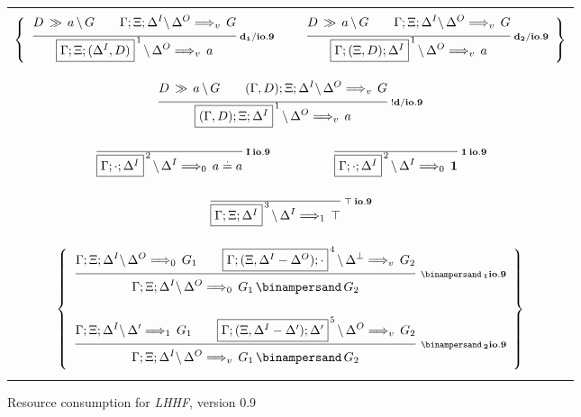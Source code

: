 \clearpage
\begin{figure}[t]
  \begin{center}
    \leavevmode

    \begin{tabular}{|c|}
      \hline \\
      $\left\{
        \begin{array}{ccc}
          \ruleII
            {\decd{D}{a}{G}}
            {\ioIX{\G;\X;\D^I}{\D^O}{G}{v}}
            {\ioIX{\fb{\G;\X;(\D^I,D)}{1}}{\D^O}{a}{v}}
            {d_1/io.9}
        &
          \hspace{0.5em}
        &
          \ruleII
            {\decd{D}{a}{G}}
            {\ioIX{\G;\X;\D^I}{\D^O}{G}{v}}
            {\ioIX{\fb{\G;(\X,D);\D^I}{1}}{\D^O}{a}{v}}
            {d_2/io.9}
        \end{array}
      \right\}$

      \\ \\ \\
      $\ruleII
        {\decd{D}{a}{G}}
        {\ioIX{(\G,D);\X;\D^I}{\D^O}{G}{v}}
        {\ioIX{\fb{(\G,D);\X;\D^I}{1}}{\D^O}{a}{v}}
        {!d/io.9}$

      \\ \\
      $\begin{array}{ccc}
        \ruleI
          {}
          {\ioIX{\fb{\G;\cdot;\D^I}{2}}{\D^I}{\eq{a}{a}}{0}}
          {I \: io.9}
      &
        \hspace{3em}
      &
        \ruleI
          {}
          {\ioIX{\fb{\G;\cdot;\D^I}{2}}{\D^I}{\One}{0}}
          {\One \: io.9}
      \end{array}$

      \\ \\
      $\ruleI
        {}
        {\ioIX{\fb{\G;\X;\D^I}{3}}{\D^I}{\Top}{1}}
        {\Top \: io.9}$

      \\ \\ \\
      $\left\{
        \begin{array}{c}
          \ruleII
            {\ioIX{\G;\X;\D^I}{\D^O}{G_1}{0}}
            {\ioIX{\fb{\G;(\X,\D^I-\D^O);\cdot}{4}}{\D^\Bot}{G_2}{v}}
            {\ioIX{\G;\X;\D^I}{\D^O}{G_1 \With G_2}{0}}
            {\With_1 io.9}
        \\ \\
          \ruleII
            {\ioIX{\G;\X;\D^I}{\D'}{G_1}{1}}
            {\ioIX{\fb{\G;(\X,\D^I-\D');\D'}{5}}{\D^O}{G_2}{v}}
            {\ioIX{\G;\X;\D^I}{\D^O}{G_1 \With G_2}{v}}
            {\With_2 io.9}
        \end{array}
      \right\}$
      \\ \\
      \hline
    \end{tabular}

    \caption{Resource consumption for {\em LHHF}, version 0.9}
    \label{fig:RC_IXa1}
  \end{center}
\end{figure}


